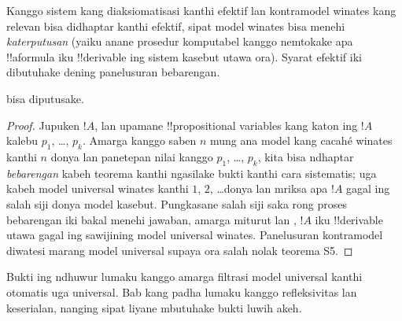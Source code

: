 \documentclass[../../../include/open-logic-section]{subfiles}
\begin{document}

Kanggo sistem kang diaksiomatisasi kanthi efektif lan kontramodel
winates kang relevan bisa didhaptar kanthi efektif, sipat model winates
bisa menehi
\emph{katerputusan} (yaiku anane prosedur komputabel kanggo nemtokake
apa !!a{formula} iku !!{derivable} ing sistem kasebut utawa ora). Syarat efektif iki dibutuhake dening panelusuran bebarengan.

\begin{thm}
   bisa diputusake.
\end{thm}

\begin{proof}
  Jupuken $!A$, lan upamane !!{propositional variable}s kang katon
  ing $!A$ kalebu $p_1$, \dots, $p_k$. Amarga kanggo saben $n$ mung
  ana model kang cacahé winates kanthi $n$ donya lan panetepan nilai
  kanggo $p_1$, \dots, $p_k$, kita bisa ndhaptar \emph{bebarengan}
  kabeh teorema  kanthi ngasilake bukti kanthi cara sistematis;
  uga kabeh model universal winates kanthi $1$, $2$, \dots donya lan
  mriksa apa $!A$ gagal ing salah siji donya model kasebut. Pungkasane
  salah siji saka rong proses bebarengan iki bakal menehi jawaban,
  amarga miturut  lan
  , $!A$ iku !!{derivable} utawa gagal ing
  sawijining model universal winates. Panelusuran kontramodel diwatesi marang model universal supaya ora salah nolak teorema S5.
\end{proof}

Bukti ing ndhuwur lumaku kanggo  amarga filtrasi model
universal kanthi otomatis uga universal. Bab kang padha lumaku kanggo
refleksivitas lan keserialan, nanging sipat liyane mbutuhake bukti
luwih akeh.
\end{document}
